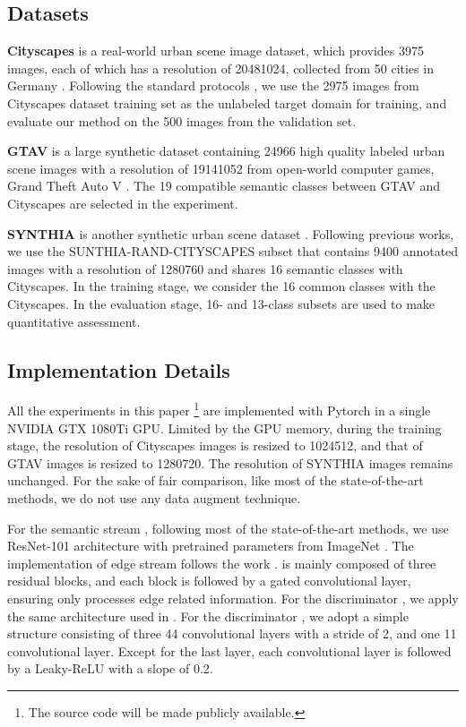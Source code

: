 \documentclass[sigconf]{acmart}
\begin{document}
\subsection{Datasets}
\par \textbf{Cityscapes} is a real-world urban scene image dataset, which provides 3975 images, each of which has a resolution of 20481024, collected from 50 cities in Germany \cite{cordts2016cityscapes}. Following the standard protocols \cite{hoffman2016fcns,luo2019taking,vu2019advent}, we use the 2975 images from Cityscapes dataset training set as the unlabeled target domain for training, and evaluate our method on the 500 images from the validation set. 

\par \textbf{GTAV} is a large synthetic dataset containing 24966 high quality labeled urban scene images with a resolution of 19141052 from open-world computer games, Grand Theft Auto V \cite{richter2016playing}. The 19 compatible semantic classes between GTAV and Cityscapes are selected in the experiment.

\par \textbf{SYNTHIA} is another synthetic urban scene dataset \cite{ros2016synthia}. Following previous works, we use the SUNTHIA-RAND-CITYSCAPES subset that contains 9400 annotated images with a resolution of 1280760 and shares 16 semantic classes with Cityscapes. In the training stage, we consider the 16 common classes with the Cityscapes. In the evaluation stage, 16- and 13-class subsets are used to make quantitative assessment. 

\subsection{Implementation Details}
\par All the experiments in this paper \footnote{The source code will be made publicly
available.} are implemented with Pytorch in a single NVIDIA GTX 1080Ti GPU. Limited by the GPU memory, during the training stage, the resolution of Cityscapes images is resized to 1024512, and that of GTAV images is resized to 1280720. The resolution of SYNTHIA images remains unchanged. For the sake of fair comparison, like most of the state-of-the-art methods, we do not use any data augment technique. 

\par For the semantic stream , following most of the state-of-the-art methods, we use ResNet-101 architecture \cite{he2016deep} with pretrained parameters from ImageNet \cite{deng2009imagenet}. The implementation of edge stream  follows the work \cite{takikawa2019gated}.  is mainly composed of three residual blocks, and each block is followed by a gated convolutional layer, ensuring  only processes edge related information. For the discriminator , we apply the same architecture used in \cite{vu2019advent}. For the discriminator , we adopt a simple structure consisting of three 44 convolutional layers with a stride of 2, and one 11 convolutional layer. Except for the last layer, each convolutional layer is followed by a Leaky-ReLU with a slope of 0.2.
\end{document}
